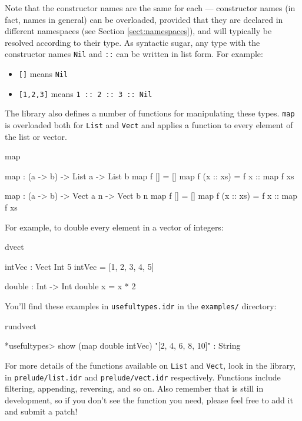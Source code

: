 \noindent
Note that the constructor names are the same for each --- constructor names (in
fact, names in general) can be overloaded, provided that they are declared in
different namespaces (see Section \ref{sect:namespaces}), and will typically be
resolved according to their type. As syntactic sugar, any type with the constructor
names \texttt{Nil} and \texttt{::} can be written in list form. For example:

\begin{itemize}
\item \texttt{[]} means \texttt{Nil}
\item \texttt{[1,2,3]} means \texttt{1 :: 2 :: 3 :: Nil}
\end{itemize}

\noindent
The library also defines a number of functions for manipulating these types.
\texttt{map} is overloaded both for \texttt{List} and \texttt{Vect}
and applies a function to every element of the list or vector.

\begin{SaveVerbatim}{map}

map : (a -> b) -> List a -> List b
map f []        = []
map f (x :: xs) = f x :: map f xs

map : (a -> b) -> Vect a n -> Vect b n
map f []        = []
map f (x :: xs) = f x :: map f xs

\end{SaveVerbatim}

\noindent
For example, to double every element in a vector of integers:

\begin{SaveVerbatim}{dvect}

intVec : Vect Int 5
intVec = [1, 2, 3, 4, 5]

double : Int -> Int
double x = x * 2

\end{SaveVerbatim}

\noindent
You'll find these examples in \texttt{usefultypes.idr} in the \texttt{examples/} directory:

\begin{SaveVerbatim}{rundvect}

*usefultypes> show (map double intVec) 
"[2, 4, 6, 8, 10]" : String

\end{SaveVerbatim}

\noindent
For more details of the functions available on \texttt{List} and \texttt{Vect},
look in the library, in \texttt{prelude/list.idr} and \texttt{prelude/vect.idr} respectively.
Functions include filtering, appending, reversing, and so on. Also remember
that \Idris{} is still in development, so if you don't see the function you
need, please feel free to add it and submit a patch!

